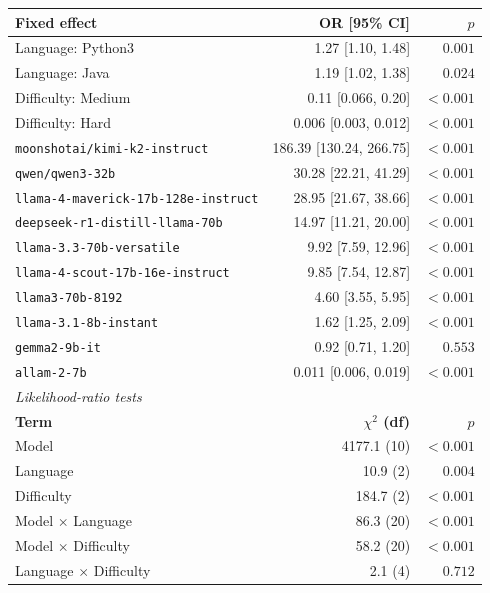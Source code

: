 \begin{tabular}{lrr}
\hline\hline
\textbf{Fixed effect} & \textbf{OR [95\% CI]} & \textbf{$p$} \\
\hline
Language: Python3 & 1.27 [1.10, 1.48] & $0.001$ \\
Language: Java & 1.19 [1.02, 1.38] & $0.024$ \\
Difficulty: Medium & 0.11 [0.066, 0.20] & $<0.001$ \\
Difficulty: Hard & 0.006 [0.003, 0.012] & $<0.001$ \\
\texttt{moonshotai/kimi-k2-instruct} & 186.39 [130.24, 266.75] & $<0.001$ \\
\texttt{qwen/qwen3-32b} & 30.28 [22.21, 41.29] & $<0.001$ \\
\texttt{llama-4-maverick-17b-128e-instruct} & 28.95 [21.67, 38.66] & $<0.001$ \\
\texttt{deepseek-r1-distill-llama-70b} & 14.97 [11.21, 20.00] & $<0.001$ \\
\texttt{llama-3.3-70b-versatile} & 9.92 [7.59, 12.96] & $<0.001$ \\
\texttt{llama-4-scout-17b-16e-instruct} & 9.85 [7.54, 12.87] & $<0.001$ \\
\texttt{llama3-70b-8192} & 4.60 [3.55, 5.95] & $<0.001$ \\
\texttt{llama-3.1-8b-instant} & 1.62 [1.25, 2.09] & $<0.001$ \\
\texttt{gemma2-9b-it} & 0.92 [0.71, 1.20] & $0.553$ \\
\texttt{allam-2-7b} & 0.011 [0.006, 0.019] & $<0.001$ \\
\hline
\multicolumn{3}{l}{\emph{Likelihood-ratio tests}} \\
\textbf{Term} & \textbf{$\chi^2$ (df)} & \textbf{$p$} \\
\hline
Model & 4177.1 (10) & $<0.001$ \\
Language & 10.9 (2) & $0.004$ \\
Difficulty & 184.7 (2) & $<0.001$ \\
Model $\times$ Language & 86.3 (20) & $<0.001$ \\
Model $\times$ Difficulty & 58.2 (20) & $<0.001$ \\
Language $\times$ Difficulty & 2.1 (4) & $0.712$ \\
\hline\hline
\end{tabular}
